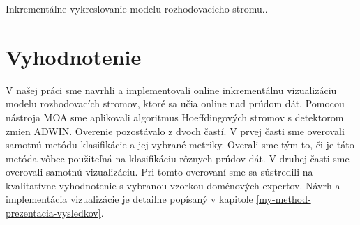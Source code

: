 \begin{algorithm}[H]
	\label{alg:visualization}
	\SetAlgoLined
    

  \caption{Inkrementálne vykreslovanie modelu rozhodovacieho stromu..}
\end{algorithm}


\chapter{Vyhodnotenie}
V našej práci sme navrhli a implementovali online inkrementálnu vizualizáciu modelu rozhodovacích stromov, ktoré sa učia online nad prúdom dát. Pomocou nástroja MOA sme aplikovali algoritmus Hoeffdingových stromov s detektorom zmien ADWIN. Overenie pozostávalo z dvoch častí. V prvej časti sme overovali samotnú metódu klasifikácie a jej vybrané metriky. Overali sme tým to, či je táto metóda vôbec použiteľná na klasifikáciu rôznych prúdov dát. V druhej časti sme overovali samotnú vizualizáciu. Pri tomto overovaní sme sa sústredili na kvalitatívne vyhodnotenie s vybranou vzorkou doménových expertov. Návrh a implementácia vizualizácie je detailne popísaný v kapitole \ref{my-method-prezentacia-vysledkov}.

